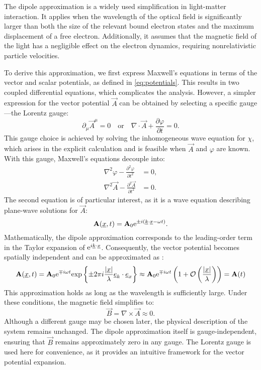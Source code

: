 The dipole approximation is a widely used simplification in light-matter interaction. It applies when the wavelength of the optical field is significantly larger than both the size of the relevant bound electron states and the maximum displacement of a free electron. 
Additionally, it assumes that the magnetic field of the light has a negligible effect on the electron dynamics, requiring nonrelativistic particle velocities.

To derive this approximation, we first express Maxwell’s equations in terms of the vector and scalar potentials, as defined in \eqref{eq:potentials}. 
This results in two coupled differential equations, which complicates the analysis. 
However, a simpler expression for the vector potential $\vec{A}$ can be obtained by selecting a specific gauge—the Lorentz gauge:
\begin{equation*}
    \partial_{\mu} \vec{A}^{\mu} = 0 \quad \text{or} \quad \nabla \cdot \vec{A} + \frac{\partial \varphi}{\partial t} = 0.
\end{equation*}
This gauge choice is achieved by solving the inhomogeneous wave equation for $\chi$, which arises in the explicit calculation and is feasible when $\vec{A}$ and $\varphi$ are known. With this gauge, Maxwell's equations decouple into:
\begin{equation*}
    \begin{aligned}
        \nabla^2 \varphi - \frac{\partial^2 \varphi}{\partial t^2} &= 0, \\
        \nabla^2 \vec{A} - \frac{\partial^2 \vec{A}}{\partial t^2} &= 0.
    \end{aligned}
\end{equation*}
The second equation is of particular interest, as it is a wave equation describing plane-wave solutions for $\vec{A}$:
\begin{equation*}
    \mathbf{A}(\underline{x}, t) = \mathbf{A}_0 \mathrm{e}^{\pm i (\underline{k} \cdot \underline{x} - \omega t)}.
\end{equation*}
Mathematically, the dipole approximation corresponds to the leading-order term in the Taylor expansion of $\mathrm{e}^{i\underline{k} \cdot \underline{x}}$. Consequently, the vector potential becomes spatially independent and can be approximated as \cite{bosmandipoleapprox}:
\begin{equation*}
    \mathbf{A}(\underline{x}, t) = \mathbf{A}_0\mathrm{e}^{\mp i \omega t}\mathrm{exp}\left\{\pm2\pi i\frac{|\underline{x}|}{\lambda}\underline{e}_k \cdot \underline{e}_x\right\} \approx \mathbf{A}_0 \mathrm{e}^{\mp i \omega t}\left(1+\mathcal{O}\left(\frac{|\underline{x}|}{\lambda}\right)\right) = \mathbf{A}(t)
\end{equation*}
This approximation holds as long as the wavelength is sufficiently large. Under these conditions, the magnetic field simplifies to:
\begin{equation*}
    \vec{B} = \nabla \times \vec{A} \approx 0.
\end{equation*}
Although a different gauge may be chosen later, the physical description of the system remains unchanged. 
The dipole approximation itself is gauge-independent, ensuring that $\vec{B}$ remains approximately zero in any gauge. 
The Lorentz gauge is used here for convenience, as it provides an intuitive framework for the vector potential expansion.

